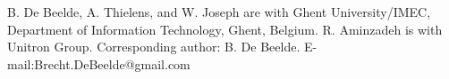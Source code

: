 \documentclass[preprint]{rsl}
\begin{document}
\vspace{3pt}

\suppressfloats


\suppressfloats

\vspace{7pt}

%
%
\noindent\small
B. De Beelde, A. Thielens, and W. Joseph are with Ghent University/IMEC, Department of Information Technology, Ghent, Belgium. 
R. Aminzadeh is with Unitron Group. 
Corresponding author: B. De Beelde. 
E-mail:Brecht.DeBeelde@gmail.com
\end{document}
